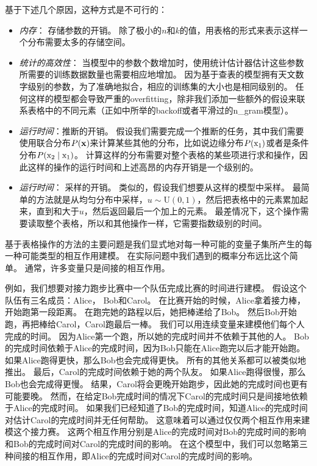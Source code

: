 基于下述几个原因，这种方式是不可行的：
\begin{itemize}
\item \emph{内存}： 存储参数的开销。
除了极小的$n$和$k$的值，用表格的形式来表示这样一个分布需要太多的存储空间。
	
\item  \emph{统计的高效性}： 当模型中的参数个数增加时，使用统计估计器估计这些参数所需要的训练数据数量也需要相应地增加。
因为基于查表的模型拥有天文数字级别的参数，为了准确地拟合，相应的训练集的大小也是相同级别的。
任何这样的模型都会导致严重的\gls{overfitting}，除非我们添加一些额外的假设来联系表格中的不同元素（正如中所举的\gls{backoff}或者平滑过的\gls{n_gram}模型）。
	
\item \emph{运行时间}：推断的开销。
假设我们需要完成一个推断的任务，其中我们需要使用联合分布$P(\mathbf{x})$来计算某些其他的分布，比如说边缘分布$P(\mathrm{x}_1)$或者是条件分布$P(\mathrm{x}_2\mid \mathrm{x}_1)$。
计算这样的分布需要对整个表格的某些项进行求和操作，因此这样的操作的运行时间和上述高昂的内存开销是一个级别的。
	
	
\item \emph{运行时间}： 采样的开销。
类似的，假设我们想要从这样的模型中采样。
最简单的方法就是从均匀分布中采样，$u\sim \text{U}(0,1)$，然后把表格中的元素累加起来，直到和大于$u$，然后返回最后一个加上的元素。
最差情况下，这个操作需要读取整个表格，所以和其他操作一样，它需要指数级别的时间。
\end{itemize}



基于表格操作的方法的主要问题是我们显式地对每一种可能的变量子集所产生的每一种可能类型的相互作用建模。
在实际问题中我们遇到的概率分布远比这个简单。
通常，许多变量只是间接的相互作用。


例如，我们想要对接力跑步比赛中一个队伍完成比赛的时间进行建模。
假设这个队伍有三名成员：Alice， Bob和Carol。
在比赛开始的时候，Alice拿着接力棒，开始跑第一段距离。
在跑完她的路程以后，她把棒递给了Bob。
然后Bob开始跑，再把棒给Carol，Carol跑最后一棒。
我们可以用连续变量来建模他们每个人完成的时间。
因为Alice第一个跑，所以她的完成时间并不依赖于其他的人。
Bob的完成时间依赖于Alice的完成时间，因为Bob只能在Alice跑完以后才能开始跑。
如果Alice跑得更快，那么Bob也会完成得更快。
所有的其他关系都可以被类似地推出。
最后，Carol的完成时间依赖于她的两个队友。
如果Alice跑得很慢，那么Bob也会完成得更慢。
结果，Carol将会更晚开始跑步，因此她的完成时间也更有可能要晚。
然而，在给定Bob完成时间的情况下Carol的完成时间只是间接地依赖于Alice的完成时间。
如果我们已经知道了Bob的完成时间，知道Alice的完成时间对估计Carol的完成时间并无任何帮助。
这意味着可以通过仅仅两个相互作用来建模这个接力赛。
这两个相互作用分别是Alice的完成时间对Bob的完成时间的影响和Bob的完成时间对Carol的完成时间的影响。
在这个模型中，我们可以忽略第三种间接的相互作用，即Alice的完成时间对Carol的完成时间的影响。


